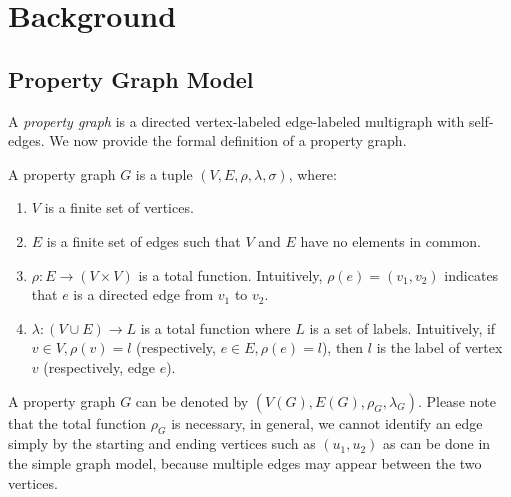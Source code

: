 \section{Background}\label{sec:background}
\subsection{Property Graph Model}
A \emph{property graph} is a directed vertex-labeled edge-labeled multigraph with self-edges.
We now provide the formal definition of a property graph.
\begin{definition}
  A property graph $G$ is a tuple $(V, E, \rho, \lambda, \sigma)$, where:
  \begin{enumerate}[noitemsep,label={(\arabic*)}]
  \item $V$ is a finite set of vertices.
  \item $E$ is a finite set of edges such that $V$ and $E$ have no elements in common.
  \item $\rho: E \rightarrow (V \times V)$ is a total function.
    Intuitively, $\rho(e) = (v_1, v_2)$ indicates that $e$ is a directed edge from $v_1$ to $v_2$.
  \item $\lambda :(V \cup E) \rightarrow L$ is a total function where $L$ is a set of labels.
    Intuitively, if $v \in V, \rho(v) = l$ (respectively, $e \in E, \rho(e) = l$),
    then $l$ is the label of vertex $v$ (respectively, edge $e$).
  \end{enumerate}
\end{definition}
A property graph $G$ can be denoted by $(V(G), E(G), \rho_G, \lambda_G)$.
Please note that the total function $\rho_G$ is necessary, in general,
we cannot identify an edge simply by the starting and ending vertices such as $(u_1, u_2)$ as can be done in the simple graph model,
because multiple edges may appear between the two vertices.
